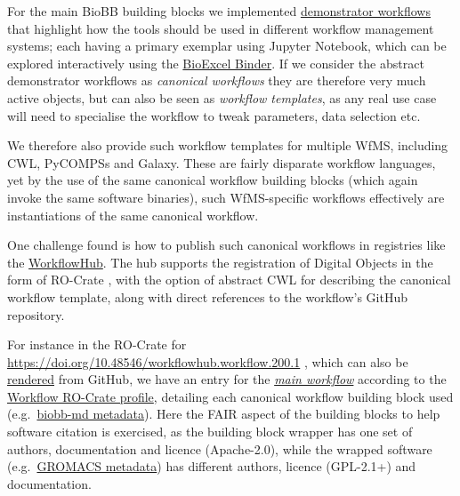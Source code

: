 For the main BioBB building blocks we implemented
\href{http://mmb.irbbarcelona.org/biobb/workflows}{demonstrator
workflows} that highlight how the tools should be used in different
workflow management systems; each having a primary exemplar using
Jupyter Notebook, which can be explored interactively using the
\href{https://hub-bioexcel-binder.tsi.ebi.ac.uk/h}{BioExcel Binder}. If
we consider the abstract demonstrator workflows as \emph{canonical
workflows} they are therefore very much active objects, but can also be
seen as \emph{workflow templates}, as any real use case will need to
specialise the workflow to tweak parameters, data selection etc.

We therefore also provide such workflow templates for multiple WfMS,
including CWL, PyCOMPSs and Galaxy. These are fairly disparate workflow
languages, yet by the use of the same canonical workflow building blocks
(which again invoke the same software binaries), such WfMS-specific
workflows effectively are instantiations of the same canonical workflow.

One challenge found is how to publish such canonical workflows in
registries like the \href{https://workflowhub.eu/}{WorkflowHub}. The hub
supports the registration of Digital Objects in the form of RO-Crate
\cite{Soiland-Reyes 2022}, with the option of abstract CWL for describing the canonical
workflow template, along with direct references to the workflow's GitHub
repository.

For instance in the RO-Crate for
\url{https://doi.org/10.48546/workflowhub.workflow.200.1} \cite{ch6-26},
which can also be
\href{https://rawcdn.githack.com/bioexcel/biobb_hpc_workflows/53958e7c278e53c277a7217057b785482f193f7f/ro-crate-preview.html}{rendered}
from GitHub, we have an entry for the
\emph{\href{https://rawcdn.githack.com/bioexcel/biobb_hpc_workflows/53958e7c278e53c277a7217057b785482f193f7f/ro-crate-preview.html\#workflows/MD/md_list.py}{main
workflow}} according to the
\href{https://w3id.org/workflowhub/workflow-ro-crate/1.0}{Workflow
RO-Crate profile}, detailing each canonical workflow building block used
(e.g.~\href{https://rawcdn.githack.com/bioexcel/biobb_hpc_workflows/53958e7c278e53c277a7217057b785482f193f7f/ro-crate-preview.html\#https\%3A//pypi.org/project/biobb-md/3.6.0/}{biobb-md
metadata}). Here the FAIR aspect of the building blocks to help software
citation is exercised, as the building block wrapper has one set of
authors, documentation and licence (Apache-2.0), while the wrapped
software
(e.g.~\href{https://rawcdn.githack.com/bioexcel/biobb_hpc_workflows/53958e7c278e53c277a7217057b785482f193f7f/ro-crate-preview.html\#https\%3A//doi.org/10.5281/zenodo.2564764}{GROMACS
metadata}) has different authors, licence (GPL-2.1+) and documentation.


